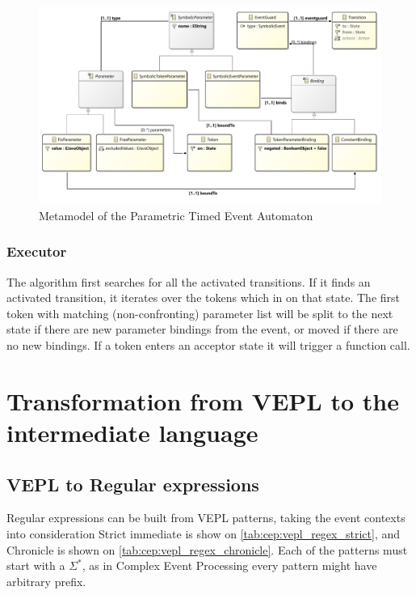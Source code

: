 \begin{figure}[h]
	\centering
	\includegraphics[width=\linewidth]{figures/chapter_5/Parameters_diagram}
	\caption{Metamodel of the Parametric Timed Event Automaton}
	\label{fig:algo:parametric_automaton}
\end{figure}

\subsubsection{Executor}
The algorithm first searches for all the activated transitions.
If it finds an activated transition, it iterates over the tokens which in on that state. The first token with matching (non-confronting)
parameter list will be split to the next state if there are new parameter bindings from the event, or moved if there are no new bindings.
If a token enters an acceptor state it will trigger a function call.

\section{Transformation from VEPL to the intermediate language}


\subsection{VEPL to Regular expressions}
Regular expressions can be built from VEPL patterns, taking the event contexts into consideration
Strict immediate is show on \cref{tab:cep:vepl_regex_strict}, and Chronicle is shown on \cref{tab:cep:vepl_regex_chronicle}.
Each of the patterns must start with a $\Sigma^*$, as in Complex Event Processing every pattern might have arbitrary prefix.


